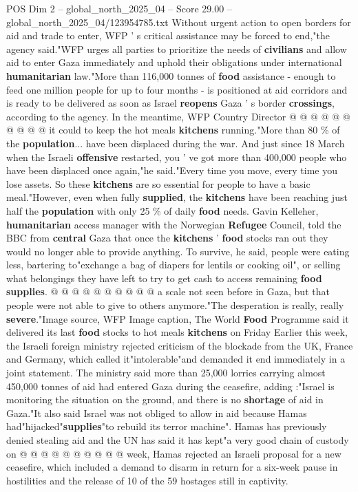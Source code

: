 \begin{textsample}{POS Dim 2 – global\_north\_2025\_04 – Score 29.00 – global\_north\_2025\_04/123954785.txt}
Without urgent action to open borders for aid and trade to enter, WFP ' s critical assistance may be forced to end,"the agency said."WFP urges all parties to prioritize the needs of \textbf{civilians} and allow aid to enter Gaza immediately and uphold their obligations under international \textbf{humanitarian} law."More than 116,000 tonnes of \textbf{food} assistance - enough to feed one million people for up to four months - is positioned at aid corridors and is ready to be delivered as soon as Israel \textbf{reopens} Gaza ' s border \textbf{crossings}, according to the agency.
In the meantime, WFP Country Director @ @ @ @ @ @ @ @ @ @ it could to keep the hot meals \textbf{kitchens} running."More than 80 \% of the \textbf{population}... have been displaced during the war.
And just since 18 March when the Israeli \textbf{offensive} restarted, you ' ve got more than 400,000 people who have been displaced once again,"he said."Every time you move, every time you lose assets.
So these \textbf{kitchens} are so essential for people to have a basic meal."However, even when fully \textbf{supplied}, the \textbf{kitchens} have been reaching just half the \textbf{population} with only 25 \% of daily \textbf{food} needs.
Gavin Kelleher, \textbf{humanitarian} access manager with the Norwegian \textbf{Refugee} Council, told the BBC from \textbf{central} Gaza that once the \textbf{kitchens} ' \textbf{food} stocks ran out they would no longer able to provide anything.
To survive, he said, people were eating less, bartering to"exchange a bag of diapers for lentils or cooking oil", or selling what belongings they have left to try to get cash to access remaining \textbf{food} \textbf{supplies}. @ @ @ @ @ @ @ @ @ @ a scale not seen before in Gaza, but that people were not able to give to others anymore."The desperation is really, really \textbf{severe}."Image source, WFP Image caption, The World \textbf{Food} Programme said it delivered its last \textbf{food} stocks to hot meals \textbf{kitchens} on Friday Earlier this week, the Israeli foreign ministry rejected criticism of the blockade from the UK, France and Germany, which called it"intolerable"and demanded it end immediately in a joint statement.
The ministry said more than 25,000 lorries carrying almost 450,000 tonnes of aid had entered Gaza during the ceasefire, adding :"Israel is monitoring the situation on the ground, and there is no \textbf{shortage} of aid in Gaza."It also said Israel was not obliged to allow in aid because Hamas had"hijacked"\textbf{supplies}"to rebuild its terror machine".
Hamas has previously denied stealing aid and the UN has said it has kept"a very good chain of custody on @ @ @ @ @ @ @ @ @ @ week, Hamas rejected an Israeli proposal for a new ceasefire, which included a demand to disarm in return for a six-week pause in hostilities and the release of 10 of the 59 hostages still in captivity.

\end{textsample}
